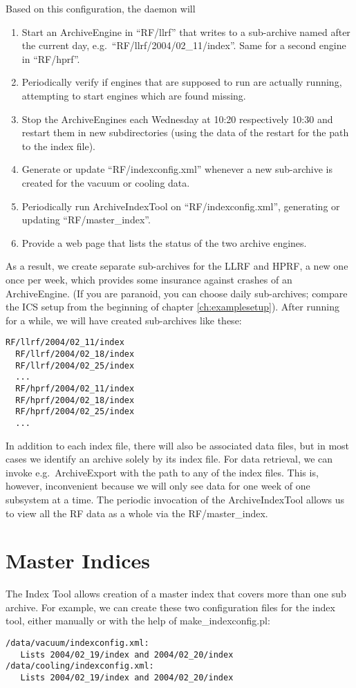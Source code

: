 \noindent Based on this configuration, the daemon will 
\begin{enumerate}
\item Start an ArchiveEngine in ``RF/llrf'' that writes to
      a sub-archive named after the current day,
      e.g.\ ``RF/llrf/2004/02\_11/index''.
      Same for a second engine in ``RF/hprf''.
\item Periodically verify if engines that are supposed to run are
      actually running, attempting to start engines which are found missing.
\item Stop the ArchiveEngines each Wednesday at 10:20 respectively
      10:30 and restart them in new subdirectories
      (using the data of the restart for the path to the index file).  
\item Generate or update ``RF/indexconfig.xml'' whenever a new
      sub-archive is created for the vacuum or cooling data.
\item Periodically run ArchiveIndexTool on ``RF/indexconfig.xml'',
      generating or updating ``RF/master\_index''.
\item Provide a web page that lists the status of the two archive
      engines.
\end{enumerate}

\noindent As a result, we create separate sub-archives for the LLRF
and HPRF, a new one once per week, which provides some insurance
against crashes of an ArchiveEngine. (If you are paranoid, you can
choose daily sub-archives; compare the ICS setup from the beginning of
chapter \ref{ch:examplesetup}).
After running for a while, we will have created sub-archives like these:
\begin{lstlisting}[frame=none,keywordstyle=\sffamily]
  RF/llrf/2004/02_11/index
  RF/llrf/2004/02_18/index
  RF/llrf/2004/02_25/index
  ...
  RF/hprf/2004/02_11/index
  RF/hprf/2004/02_18/index
  RF/hprf/2004/02_25/index
  ...
\end{lstlisting}
\noindent In addition to each index file, there will also be
associated data files, but in most cases we identify an archive solely
by its index file.
For data retrieval, we can invoke e.g.\ ArchiveExport with the path to
any of the index files. This is, however, inconvenient because we will
only see data for one week of one subsystem at a time.
The periodic invocation of the ArchiveIndexTool allows us to view all
the RF data as a whole via the RF/master\_index.

\section{Master Indices}
The Index Tool allows creation of a master index
that covers more than one sub archive. For example, we can create
these two configuration files for the index tool, either manually or
with the help of make\_indexconfig.pl:
\begin{lstlisting}[frame=none,keywordstyle=\sffamily]
/data/vacuum/indexconfig.xml:
   Lists 2004/02_19/index and 2004/02_20/index
/data/cooling/indexconfig.xml:
   Lists 2004/02_19/index and 2004/02_20/index
\end{lstlisting}

